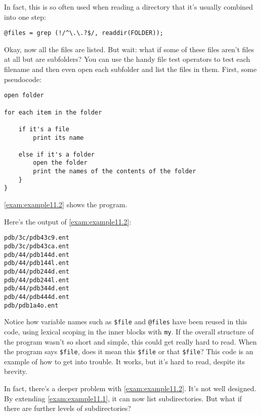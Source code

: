 In fact, this is so often used when reading a directory that it's usually combined into one step: 

\begin{lstlisting}
@files = grep (!/^\.\.?$/, readdir(FOLDER));
\end{lstlisting}

Okay, now all the files are listed. But wait: what if some of these files aren't files at all but are subfolders? You can use the handy file test operators to test each filename and then even open each subfolder and list the files in them. First, some pseudocode: 

\begin{lstlisting}
open folder

for each item in the folder

    if it's a file
        print its name

    else if it's a folder
        open the folder
        print the names of the contents of the folder
    }
}
\end{lstlisting}

\autoref{exam:example11.2} shows the program.



Here's the output of \autoref{exam:example11.2}:

\begin{lstlisting}
pdb/3c/pdb43c9.ent
pdb/3c/pdb43ca.ent
pdb/44/pdb144d.ent
pdb/44/pdb144l.ent
pdb/44/pdb244d.ent
pdb/44/pdb244l.ent
pdb/44/pdb344d.ent
pdb/44/pdb444d.ent
pdb/pdb1a4o.ent
\end{lstlisting}

Notice how variable names such as \verb|$file| and \verb|@files| have been reused in this code, using lexical scoping in the inner blocks with \verb|my|. If the overall structure of the program wasn't so short and simple, this could get really hard to read. When the program says \verb|$file|, does it mean this \verb|$file| or that \verb|$file|? This code is an example of how to get into trouble. It works, but it's hard to read, despite its brevity.

In fact, there's a deeper problem with \autoref{exam:example11.2}. It's not well designed. By extending \autoref{exam:example11.1}, it can now list subdirectories. But what if there are further levels of subdirectories? 


